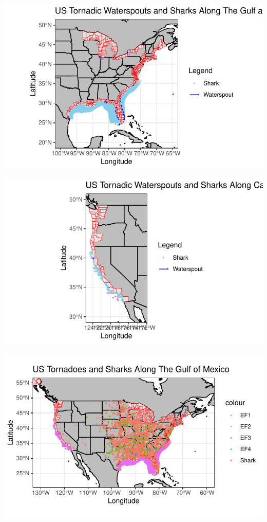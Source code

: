 \documentclass[
  letterpaper,
  DIV=11,
  numbers=noendperiod]{scrreprt}
\begin{document}
\includegraphics{draft-results2_files/figure-pdf/Path of Waterspouts in the US-3.pdf}

\includegraphics{draft-results2_files/figure-pdf/Path of Waterspouts in the US-4.pdf}

\includegraphics{draft-results2_files/figure-pdf/Path of Tornadoes in the US-1.pdf}
\end{document}

